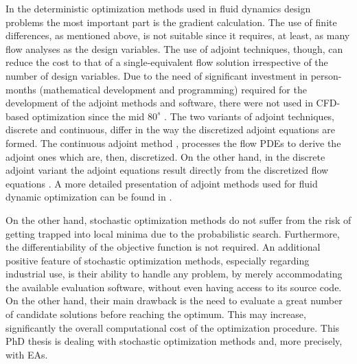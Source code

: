 In the deterministic optimization methods used in fluid dynamics design problems the most important part is the gradient calculation. The use of finite differences, as mentioned above, is not suitable since it requires, at least, as many flow analyses as the design variables. The use of adjoint techniques, though, can reduce the cost to that of a single-equivalent flow solution irrespective of the number of design variables. Due to the need of significant investment in person-months (mathematical development and programming) required for the development of the adjoint methods and software, there were not used in CFD-based optimization since the mid $80^s$ \cite{piron:84, kn:Jame88, kn:Jame94, kn:Jame95}.  The two variants of adjoint techniques, discrete and continuous, differ in the way the discretized adjoint equations are formed. The continuous adjoint method \cite{kn:Jame94, kn:Ander99,phd:papadim}, processes the flow PDEs to derive the adjoint ones which are, then, discretized. On the other hand, in the discrete adjoint variant the adjoint equations result directly from the discretized flow equations \cite{kn:Elliott96, anderson:99}. A more detailed presentation of adjoint methods used for fluid dynamic optimization can be found in \cite{phd:papadim}.        

On the other hand, stochastic optimization methods  do not suffer from the risk of getting trapped into local minima due to the probabilistic search. Furthermore, the differentiability of the objective function is not required. An additional positive feature of stochastic optimization methods, especially regarding industrial use, is their ability to handle any problem, by merely accommodating the available evaluation software, without even having access to its source code. On the other hand, their main drawback is the need to evaluate a great number of candidate solutions before reaching the optimum. This may increase, significantly the overall computational cost of the optimization procedure. This PhD thesis is dealing with stochastic optimization methods and, more precisely, with EAs. 


